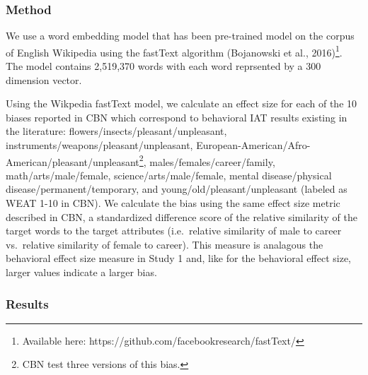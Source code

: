 \documentclass[10pt, letterpaper]{article}
\begin{document}
\subsubsection{Method}\label{method-1}

We use a word embedding model that has been pre-trained model on the
corpus of English Wikipedia using the fastText algorithm (Bojanowski et
al.,
2016)\footnote{Available here: https://github.com/facebookresearch/fastText/}.
The model contains 2,519,370 words with each word reprsented by a 300
dimension vector.

Using the Wikpedia fastText model, we calculate an effect size for each
of the 10 biases reported in CBN which correspond to behavioral IAT
results existing in the literature: flowers/insects/pleasant/unpleasant,
instruments/weapons/pleasant/unpleasant,
European-American/Afro-American/pleasant/unpleasant\footnote{CBN test three versions of this bias.},
males/females/career/family, math/arts/male/female,
science/arts/male/female, mental disease/physical
disease/permanent/temporary, and young/old/pleasant/unpleasant (labeled
as WEAT 1-10 in CBN). We calculate the bias using the same effect size
metric described in CBN, a standardized difference score of the relative
similarity of the target words to the target attributes (i.e.~relative
similarity of male to career vs.~relative similarity of female to
career). This measure is analagous the behavioral effect size measure in
Study 1 and, like for the behavioral effect size, larger values indicate
a larger bias.

\subsubsection{Results}\label{results-1}
\end{document}
